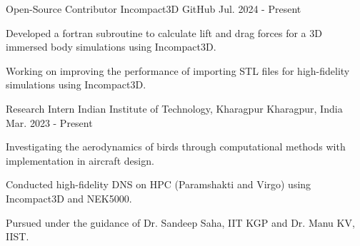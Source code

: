 

\begin{cventries}
  \cventry
  {Open-Source Contributor} %
  {Incompact3D} %
  {GitHub} %
  {Jul. 2024 - Present} %
  {
    \begin{cvitems} %
      \item {Developed a fortran subroutine to calculate lift and drag forces for a 3D immersed body simulations using Incompact3D.}
      \item {Working on improving the performance of importing STL files for high-fidelity simulations using Incompact3D.}
    \end{cvitems}
  }

  \cventry
  {Research Intern} %
  {Indian Institute of Technology, Kharagpur} %
  {Kharagpur, India} %
  {Mar. 2023 - Present} %
  {
    \begin{cvitems} %
      \item {Investigating the aerodynamics of birds through computational methods with implementation in aircraft design.}
      \item {Conducted high-fidelity DNS on HPC (Paramshakti and Virgo) using Incompact3D and NEK5000.}
      \item{Pursued under the guidance of Dr. Sandeep Saha, IIT KGP and Dr. Manu KV, IIST.}
    \end{cvitems}
  }
\end{cventries}
